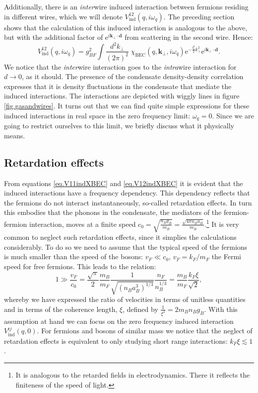 Additionally, there is an \textit{inter}wire induced interaction between fermions residing in different wires, which we will denote $V_{\text{ind}}^{12}(q,i\omega_q)$. The preceding section shows that the calculation of this induced interaction is analogous to the above, but with the additional factor of $\text{e}^{i\mathbf{k}_\perp\cdot \mathbf{d}}$ from scattering in the second wire. Hence:
\begin{equation}
V_{\text{ind}}^{12}(q,i\omega_q) = g_{BF}^2\int\frac{d^2k_\perp}{(2\pi)^2}\; \chi_\text{BEC}(q,\mathbf{k}_\perp, i\omega_q)\text{e}^{-\frac{l_t^2}{2}k_\perp^2}\text{e}^{i\mathbf{k}_\perp\cdot \mathbf{d}}. 
\label{eq.V12indXBEC} 
\end{equation}
We notice that the \textit{inter}wire interaction goes to the \textit{intra}wire interaction for $d \to 0$, as it should. The presence of the condensate density-density correlation expresses that it is density fluctuations in the condensate that mediate the induced interactions. The interactions are depicted with wiggly lines in figure \ref{fig.gasandwires}. It turns out that we can find quite simple expressions for these induced interactions in real space in the zero frequency limit: $\omega_q = 0$. Since we are going to restrict ourselves to this limit, we briefly discuss what it physically means. 

\subsection{Retardation effects} \label{sec.RetardationEffects}
From equations \eqref{eq.V11indXBEC} and \eqref{eq.V12indXBEC} it is evident that the induced interactions have a frequency dependency. This dependency reflects that the fermions do not interact instantaneously, so-called retardation effects. In turn this embodies that the phonons in the condensate, the mediators of the fermion-fermion interaction, moves at a finite speed $c_0 = \sqrt{\frac{n_Bg_B}{m_B}} = \frac{\sqrt{4\pi n_B a_B}}{m_B}$.\footnote{It is analogous to the retarded fields in electrodynamics. There it reflects the finiteness of the speed of light.} It is very common to neglect such retardation effects, since it simplies the calculations considerably. To do so we need to assume that the typical speed of the fermions is much smaller than the speed of the bosons: $v_F \ll c_0$, $v_F = k_F/m_F$ the Fermi speed for free fermions. This leads to the relation:
\begin{equation}
1 \gg \frac{v_F}{c_0} = \frac{\sqrt{\pi}}{2} \frac{m_B}{m_F}\frac{1}{ \sqrt{ (n_Ba_B^3)^{1/3} } }\frac{n_F}{ n_B^{1/3} } = \frac{m_B}{m_F}\frac{k_F\xi}{\sqrt{2}}, 
\label{eq.RetardationEffectsneglectionassumption}
\end{equation}
whereby we have expressed the ratio of velocities in terms of unitless quantities and in terms of the coherence length, $\xi$, defined by $\frac{1}{\xi^2} = 2m_Bn_Bg_B$. With this assumption at hand we can focus on the zero frequency induced interaction $V^{ij}_{\text{ind}}(q,0)$. For fermions and bosons of similar mass we notice that the neglect of retardation effects is equivalent to only studying short range interactions: $k_F\xi \lesssim 1$. 

